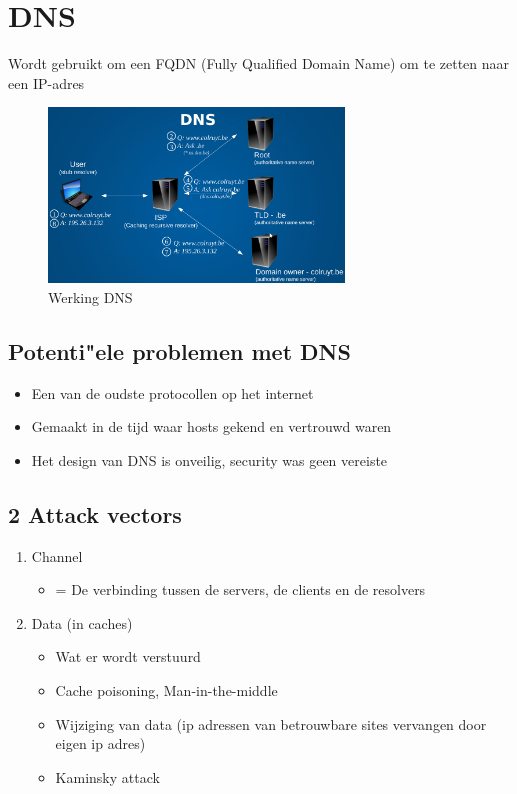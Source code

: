 \documentclass{article}
\begin{document}
\section{DNS}

Wordt gebruikt om een FQDN (Fully Qualified Domain Name) om te zetten naar een IP-adres

\begin{figure}[H]
    \centering
    \includegraphics[width=0.7\textwidth]{dns.png}
    \caption{Werking DNS}
\end{figure}


\subsection{Potenti"ele problemen met DNS}

\begin{itemize}
    \item Een van de oudste protocollen op het internet
    \item Gemaakt in de tijd waar hosts gekend en vertrouwd waren
    \item Het design van DNS is onveilig, security was geen vereiste
\end{itemize}

\subsection{2 Attack vectors}

\begin{enumerate}
    \item Channel
    \begin{itemize}
        \item = De verbinding tussen de servers, de clients en de resolvers
    \end{itemize}
    \item Data (in caches)
    \begin{itemize}
        \item Wat er wordt verstuurd
        \item Cache poisoning, Man-in-the-middle
        \item Wijziging van data (ip adressen van betrouwbare sites vervangen door eigen ip adres)
        \item Kaminsky attack
    \end{itemize}
\end{enumerate}
\end{document}
